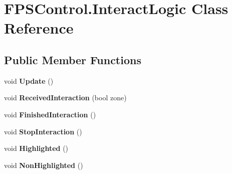 \hypertarget{class_f_p_s_control_1_1_interact_logic}{\section{F\-P\-S\-Control.\-Interact\-Logic Class Reference}
\label{class_f_p_s_control_1_1_interact_logic}
}
\subsection*{Public Member Functions}
\begin{DoxyCompactItemize}
\item 
\hypertarget{class_f_p_s_control_1_1_interact_logic_ac13c9ebeef5c7420d9350e17b85c544f}{void {\bfseries Update} ()}\label{class_f_p_s_control_1_1_interact_logic_ac13c9ebeef5c7420d9350e17b85c544f}

\item 
\hypertarget{class_f_p_s_control_1_1_interact_logic_a39f6ea23bd26615f34d48f4c8e2babfd}{void {\bfseries Received\-Interaction} (bool zone)}\label{class_f_p_s_control_1_1_interact_logic_a39f6ea23bd26615f34d48f4c8e2babfd}

\item 
\hypertarget{class_f_p_s_control_1_1_interact_logic_a39b5d78a7c46222fad1f668b4b0d87b1}{void {\bfseries Finished\-Interaction} ()}\label{class_f_p_s_control_1_1_interact_logic_a39b5d78a7c46222fad1f668b4b0d87b1}

\item 
\hypertarget{class_f_p_s_control_1_1_interact_logic_a34301e431e02fbbfc9841a757f06bdcd}{void {\bfseries Stop\-Interaction} ()}\label{class_f_p_s_control_1_1_interact_logic_a34301e431e02fbbfc9841a757f06bdcd}

\item 
\hypertarget{class_f_p_s_control_1_1_interact_logic_a0ab7c11775b5f6aaa26155aa9201ed7d}{void {\bfseries Highlighted} ()}\label{class_f_p_s_control_1_1_interact_logic_a0ab7c11775b5f6aaa26155aa9201ed7d}

\item 
\hypertarget{class_f_p_s_control_1_1_interact_logic_a132e2260fa8dbe6f00cf1ff8f919ddcc}{void {\bfseries Non\-Highlighted} ()}\label{class_f_p_s_control_1_1_interact_logic_a132e2260fa8dbe6f00cf1ff8f919ddcc}

\end{DoxyCompactItemize}

